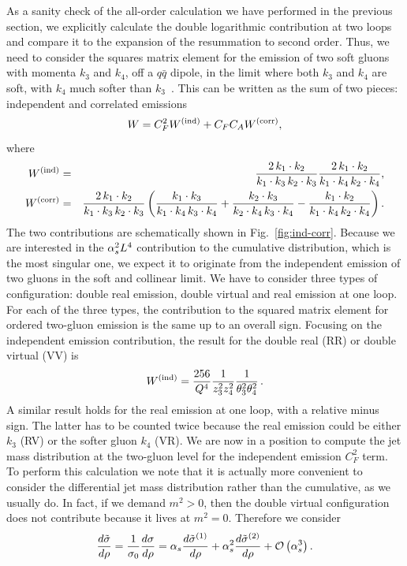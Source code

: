 As a sanity check of the all-order calculation we have performed in the previous section, we explicitly calculate the double logarithmic contribution at two loops and compare it to the expansion of the resummation to second order.
%
Thus, we need to consider the squares matrix element for the emission
of two soft gluons with momenta $k_3$ and $k_4$, off a $q \bar q$
dipole, in the limit where both $k_3$ and $k_4$ are soft, with $k_4$ much softer than $k_3$~\cite{Catani:1983bz,Dokshitzer:1992ip}. This can be written as the sum of two pieces: independent and correlated emissions
\begin{equation}\label{eq:2gluons}
W= C_{F}^2 W^{(\rm ind)}+ C_{F} C_{A} W^{(\rm corr)},
\end{equation}
where
\begin{eqnarray}
W^{(\rm ind)}&=&   \frac{2\, k_1\cdot k_2}{k_1\cdot k_3 \, k_2 \cdot k_3}   \frac{2\, k_1\cdot k_2}{k_1\cdot k_4 \, k_2 \cdot k_4}, \label{eq:independent}\\
W^{(\rm corr)}&=&  \frac{2\, k_1\cdot k_2}{k_1\cdot k_3 \, k_2 \cdot k_3}
 \left( \frac{k_1\cdot k_3}{k_1\cdot k_4 \, k_3 \cdot k_4}+ \frac{k_2\cdot k_3}{k_2\cdot k_4 \, k_3 \cdot k_4}-
  \frac{k_1\cdot k_2}{k_1\cdot k_4 \, k_2 \cdot k_4}
 \right).\label{eq:correlated}
\end{eqnarray}
The two contributions are schematically shown in Fig.~\ref{fig:ind-corr}.
%
Because we are interested in the $\alpha_s^2 L^4$ contribution to the cumulative distribution, which is the most singular one, we expect it to originate from the independent emission  of two gluons in the soft and collinear limit. 
%
We have to consider three types of configuration: double real emission, double virtual and real emission at one loop. 
%
For each of the three types, the contribution to the squared matrix
element for ordered two-gluon emission is the same up to an overall sign. Focusing on the independent emission contribution, the result for the double real (RR) or double virtual (VV) is
%
\begin{equation}
W^{(\rm ind)} =   \frac{256}{Q^4} \frac{1}{z_3^2 z_4^2} \frac{1}{\theta_3^2 \theta_4^2 }\,.
\end{equation}
A similar result holds for the real emission at one loop, with a
relative minus sign. The latter has to be counted twice because the real
emission could be either $k_3$ (RV) or the softer gluon $k_4$ (VR).
 We are now in a position to compute the jet mass distribution at the two-gluon level for the independent emission $C_F^2$ term. 
% 
To perform this calculation we note that it is actually more convenient to consider the differential jet mass distribution rather than the cumulative, as we usually do. In fact, if we demand $m^2>0$, then the double virtual configuration does not contribute because it lives at $m^2=0$.
% 
Therefore we consider
\begin{equation}
\frac{d \tilde \sigma}{d \rho}=\frac{1}{\sigma_0}\frac{d \sigma}{d \rho}=
\alpha_s \frac{d \tilde \sigma^{(1)}}{d \rho}+\alpha_s^2 \frac{d \tilde \sigma^{(2)}}{d \rho}+ \mathcal{O} \left(\alpha_s^3 \right).
\end{equation}


